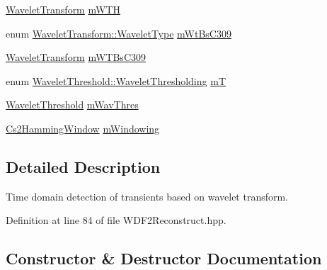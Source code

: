 \begin{DoxyCompactItemize}
\hyperlink{classtsa_1_1_wavelet_transform}{Wavelet\+Transform} \hyperlink{classtsa_1_1_w_d_f2_reconstruct_af77219bc01d5cb4f609484186cbae5ad}{m\+W\+TH}
\item 
enum \hyperlink{classtsa_1_1_wavelet_transform_a5a529de70e0004333fcf23b9cca88ce7}{Wavelet\+Transform\+::\+Wavelet\+Type} \hyperlink{classtsa_1_1_w_d_f2_reconstruct_a519de0df835b67a827d294e3b7f81f2c}{m\+Wt\+Bs\+C309}
\item 
\hyperlink{classtsa_1_1_wavelet_transform}{Wavelet\+Transform} \hyperlink{classtsa_1_1_w_d_f2_reconstruct_aa1285fe7b4f8823822f615c7b3c2fc96}{m\+W\+T\+Bs\+C309}
\item 
enum \hyperlink{classtsa_1_1_wavelet_threshold_a50c42c95dae960986a985157ca038fae}{Wavelet\+Threshold\+::\+Wavelet\+Thresholding} \hyperlink{classtsa_1_1_w_d_f2_reconstruct_ae36f218c387d68609cbeb6301061d2c6}{mT}
\item 
\hyperlink{classtsa_1_1_wavelet_threshold}{Wavelet\+Threshold} \hyperlink{classtsa_1_1_w_d_f2_reconstruct_a529018ba087a57db45f9aa578c3b4cb0}{m\+Wav\+Thres}
\item 
\hyperlink{classtsa_1_1_cs2_hamming_window}{Cs2\+Hamming\+Window} \hyperlink{classtsa_1_1_w_d_f2_reconstruct_a761d1ab7e8909495fb393fab825535a0}{m\+Windowing}
\end{DoxyCompactItemize}


\subsection{Detailed Description}
Time domain detection of transients based on wavelet transform. 

Definition at line 84 of file W\+D\+F2\+Reconstruct.\+hpp.



\subsection{Constructor \& Destructor Documentation}
\mbox{\label{classtsa_1_1_w_d_f2_reconstruct_adfa6c8b28248983673226fd3617b553d}} 
